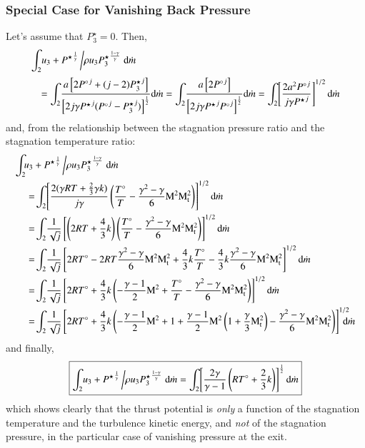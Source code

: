 \documentclass{warpdoc}
\numberwithin{equation}{section}
\newcommand{\alb}{\vspace{0.2cm}\\} %
\newcommand{\turb}{_{\rm t}}
\newcommand{\mfd}{\displaystyle}
\newcommand{\ordi}{{\rm d}}
\newcommand{\mdot}{\dot{m}}
\newcommand\frameeqn[1]{\fbox{$#1$}}
\begin{document}
\subsubsection{Special Case for Vanishing Back Pressure}

Let's assume that $P_3^\star=0$. Then,
%
%
\begin{equation}
\begin{array}{l}
\mfd\int_2 \! u_{3}
 + {P^\star}^{\frac{1}{\gamma}}  \left/ \rho u_{3}{P_3^\star}^{\frac{1-\gamma}{\gamma}}
    \right.\ordi \mdot \alb
~~~~=\mfd\int_2 \!
  \frac{
   a \left[ 2 {P^\circ}^j + (j-2) {P_3^\star}^j \right]
  }{
    \left[2 j \gamma {P^\star}^j ( {P^\circ}^j-{P_3^\star}^j) \right]^\frac{1}{2}
  }
   \ordi \mdot
=\mfd\int_2 \!
  \frac{
   a \left[ 2 {P^\circ}^j \right]
  }{
    \left[2 j \gamma {P^\star}^j {P^\circ}^j\right]^\frac{1}{2}
  }
   \ordi \mdot
=\mfd\int_2 \!
  \left[
  \frac{
   2 a^2  {P^\circ}^j
  }{
     j \gamma {P^\star}^j
  }
  \right]^{1/2}
   \ordi \mdot
\end{array}
\end{equation}
%
and, from the relationship between the stagnation pressure ratio and the stagnation
temperature ratio:
%
%
\begin{align*}
\int_2& \! u_{3}
 + {P^\star}^{\frac{1}{\gamma}}  \left/ \rho u_{3}{P_3^\star}^{\frac{1-\gamma}{\gamma}}
    \right.\ordi \mdot \alb
&=\!\mfd\int_2 \!
  \left[
  \frac{2 (\gamma R T + \frac{2}{3} \gamma k)}{j \gamma}
  \left( \frac{T^\circ}{T} - \frac{\gamma^2-\gamma}{6} {\rm M}^2 {\rm M}^2\turb \right)
  \right]^{1/2}
   \ordi \mdot\alb
&=\!\mfd \int_2 \!
  \frac{1}{\sqrt{j}} \left[
  \left( 2 R T + \frac{4}{3} k \right)
  \left( \frac{T^\circ}{T} - \frac{\gamma^2-\gamma}{6} {\rm M}^2 {\rm M}^2\turb \right)
  \right]^{1/2}
   \ordi \mdot\alb
&=\!\mfd \int_2 \!
  \frac{1}{\sqrt{j}}\left[
  2 R T^\circ -  2 R T \frac{\gamma^2-\gamma}{6} {\rm M}^2 {\rm M}^2\turb
  + \frac{4}{3} k \frac{T^\circ}{T} -  \frac{4}{3} k \frac{\gamma^2-\gamma}{6} {\rm M}^2 {\rm M}^2\turb
  \right]^{1/2}
   \ordi \mdot\alb
&=\!\mfd \int_2 \!
  \frac{1}{\sqrt{j}}\left[
  2 R T^\circ +  \frac{4}{3} k \left( -\frac{\gamma-1}{2} {\rm M}^2
  + \frac{T^\circ}{T} -  \frac{\gamma^2-\gamma}{6} {\rm M}^2 {\rm M}^2\turb \right)
  \right]^{1/2}
   \ordi \mdot\alb
&=\!\mfd \int_2 \!
  \frac{1}{\sqrt{j}}\left[
  2 R T^\circ +  \frac{4}{3} k \left( -\frac{\gamma-1}{2} {\rm M}^2
  +1+\mfd\frac{\gamma-1}{2} {\rm M}^2
                     \left(1+\mfd\frac{\gamma}{3} {\rm M}\turb^2 \right)  -  \frac{\gamma^2-\gamma}{6} {\rm M}^2 {\rm M}^2\turb \right)
  \right]^{1/2}
  \!\!\!\!\! \ordi \mdot\alb
\end{align*}
%
and finally,
%
\begin{equation}
\frameeqn{
\mfd\int_2 \! u_{3}
 + {P^\star}^{\frac{1}{\gamma}}  \left/ \rho u_{3}{P_3^\star}^{\frac{1-\gamma}{\gamma}}
    \right.\ordi \mdot
   =\int_2 \!
  \left[
    \frac{2\gamma}{\gamma-1} \left( R T^\circ +  \frac{2}{3} k \right)
  \right]^\frac{1}{2}
   \ordi \mdot
 }
\end{equation}
%
which shows clearly that the thrust potential is \emph{only} a function of
the stagnation temperature and the turbulence kinetic energy, and \emph{not}
of the stagnation pressure, in the particular case of vanishing pressure
at the exit.
\end{document}
